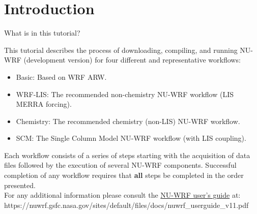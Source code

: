 \begin{frame}
\maketitle
\end{frame}

\section{Introduction}

\begin{frame}{What is in this tutorial?}

\footnotesize{
This tutorial  describes the process of downloading, compiling, and running NU-WRF (development version) for four different and representative workflows:
\begin{itemize}
     \item Basic: Based on WRF ARW.
     \item WRF-LIS: The recommended non-chemistry NU-WRF workflow (LIS MERRA forcing).
     \item Chemistry: The recommended chemistry (non-LIS) NU-WRF workflow.
     \item SCM: The Single Column Model NU-WRF workflow (with LIS coupling).
\end{itemize}
Each workflow consists of a series of steps starting with the acquisition of data files followed by the execution of several NU-WRF components. Successful completion of any workflow requires that \textbf{all} steps be completed in the order presented.
\mbox{}\\
For any additional information please consult the \href{https://nuwrf.gsfc.nasa.gov/sites/default/files/docs/nuwrf_userguide.pdf}{NU-WRF user's guide} at: https://nuwrf.gsfc.nasa.gov/sites/default/files/docs/nuwrf\_userguide\_v11.pdf
}

\end{frame}

